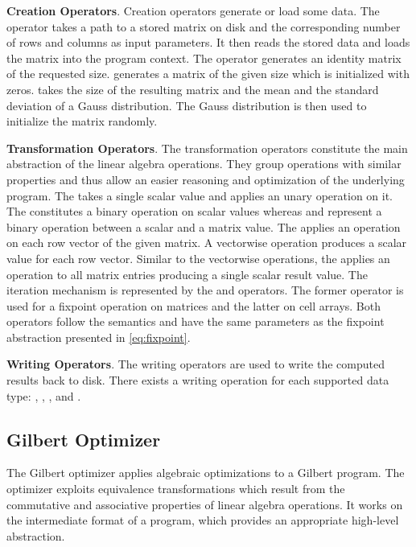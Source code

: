 \textbf{Creation Operators}. Creation operators generate or load some data.
The  operator takes a path to a stored matrix on disk and the corresponding number of rows and columns as input parameters.
It then reads the stored data and loads the matrix into the program context.
The  operator generates an identity matrix of the requested size.
 generates a matrix of the given size which is initialized with zeros.
 takes the size of the resulting matrix and the mean and the standard deviation of a Gauss distribution.
The Gauss distribution is then used to initialize the matrix randomly.

\textbf{Transformation Operators}. The transformation operators constitute the main abstraction of the linear algebra operations.
They group operations with similar properties and thus allow an easier reasoning and optimization of the underlying program. 
The  takes a single scalar value and applies an unary operation on it. 
The  constitutes a binary operation on scalar values whereas  and  represent a binary operation between a scalar and a matrix value. 
The  applies an operation on each row vector of the given matrix.
A vectorwise operation produces a scalar value for each row vector. 
Similar to the vectorwise operations, the  applies an operation to all matrix entries producing a single scalar result value. 
The iteration mechanism is represented by the  and  operators. 
The former operator is used for a fixpoint operation on matrices and the latter on cell arrays. 
Both operators follow the semantics and have the same parameters as the fixpoint abstraction presented in \cref{eq:fixpoint}.

\textbf{Writing Operators}. The writing operators are used to write the computed results back to disk.
There exists a writing operation for each supported data type: , , ,  and .

\subsection{Gilbert Optimizer}
\label{sec:gilbertOptimizer}

The Gilbert optimizer applies algebraic optimizations to a Gilbert program.
The optimizer exploits equivalence transformations which result from the commutative and associative properties of linear algebra operations.
It works on the intermediate format of a program, which provides an appropriate high-level abstraction.

